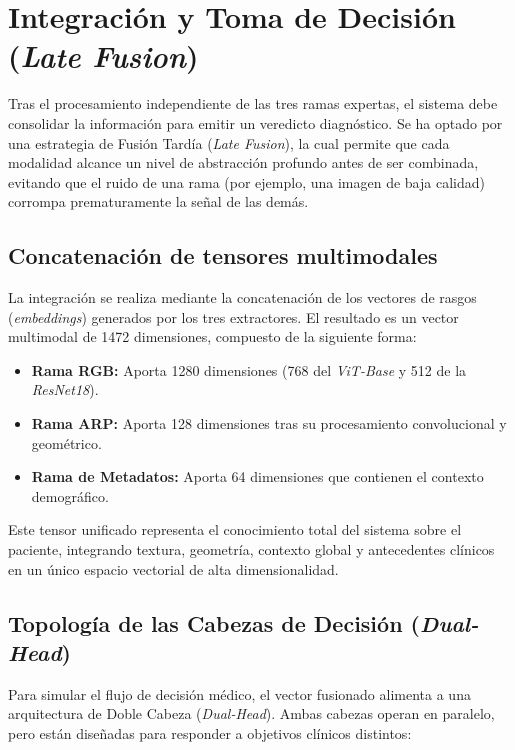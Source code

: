 \section{Integración y Toma de Decisión (\textit{Late Fusion})}

Tras el procesamiento independiente de las tres ramas expertas, el sistema debe consolidar la información para emitir un veredicto diagnóstico. Se ha optado por una estrategia de Fusión Tardía (\textit{Late Fusion}), la cual permite que cada modalidad alcance un nivel de abstracción profundo antes de ser combinada, evitando que el ruido de una rama (por ejemplo, una imagen de baja calidad) corrompa prematuramente la señal de las demás.

\subsection{Concatenación de tensores multimodales}

La integración se realiza mediante la concatenación de los vectores de rasgos (\textit{embeddings}) generados por los tres extractores. El resultado es un vector multimodal de 1472 dimensiones, compuesto de la siguiente forma:

\begin{itemize}
	\item \textbf{Rama RGB:} Aporta 1280 dimensiones (768 del \textit{ViT-Base} y 512 de la \textit{ResNet18}).
	\item \textbf{Rama ARP:} Aporta 128 dimensiones tras su procesamiento convolucional y geométrico.
	\item \textbf{Rama de Metadatos:} Aporta 64 dimensiones que contienen el contexto demográfico.
\end{itemize}



Este tensor unificado representa el conocimiento total del sistema sobre el paciente, integrando textura, geometría, contexto global y antecedentes clínicos en un único espacio vectorial de alta dimensionalidad.

\subsection{Topología de las Cabezas de Decisión (\textit{Dual-Head})}

Para simular el flujo de decisión médico, el vector fusionado alimenta a una arquitectura de Doble Cabeza (\textit{Dual-Head}). Ambas cabezas operan en paralelo, pero están diseñadas para responder a objetivos clínicos distintos:

